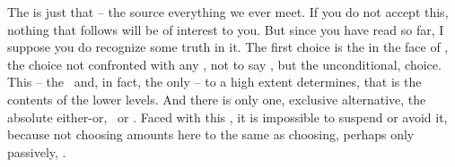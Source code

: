 The  is just that -- the  source 
everything we ever meet.  If you do not accept this, nothing that
follows will be of interest to you.  But since you have read so far, I
suppose you do recognize some truth in it.  The first choice is the 
 in the face of , the choice not 
confronted with any , not to say , but 
the unconditional,  choice. 
This 
-- the \sch\ and, in fact, the only  -- to a
high extent determines, that is  the contents 
of the lower levels.  And
there is only one, exclusive alternative, the absolute either-or,
\yes\ or \No.  Faced with this , it is impossible to suspend or
avoid it, because not choosing amounts here to the same as choosing,
perhaps only passively, \No.   


